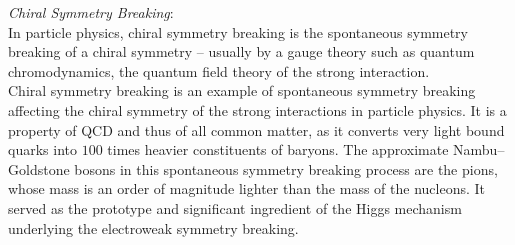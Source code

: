 \emph{Chiral Symmetry Breaking}:\\
In particle physics, chiral symmetry breaking is the spontaneous symmetry breaking of a chiral symmetry – usually by a gauge theory such as quantum chromodynamics, the quantum field theory of the strong interaction.\\
Chiral symmetry breaking is an example of spontaneous symmetry breaking affecting the chiral symmetry of the strong interactions in particle physics. It is a property of QCD and thus of all common matter, as it converts very light bound quarks into $100$ times heavier constituents of baryons. The approximate Nambu–Goldstone bosons in this spontaneous symmetry breaking process are the pions, whose mass is an order of magnitude lighter than the mass of the nucleons. It served as the prototype and significant ingredient of the Higgs mechanism underlying the electroweak symmetry breaking.

























